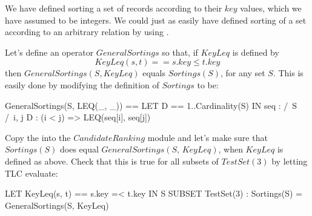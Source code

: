 \documentclass[fleqn,leqno]{article}
\begin{document}
\bigskip

We have defined sorting a set of records according to their $key$
values, which we have assumed to be integers.  We could just as easily
have defined sorting of a set according to an arbitrary relation by
using 
 .

Let's define an operator $GeneralSortings$ so that, if $KeyLeq$
is defined by
 \[ KeyLeq(s, t) == s.key \leq t.key
 \]
then $GeneralSortings(S, KeyLeq)$ equals $Sortings(S)$, for any set
$S$.  This is easily done by modifying the definition of $Sortings$
to be:
\begin{widedisplay}
\begin{notla}
GeneralSortings(S, LEQ(_, _)) ==
   LET D == 1..Cardinality(S)
   IN { seq \in [D -> S] : /\ S 
                           /\ \A i, j \in D : (i < j) => LEQ(seq[i], seq[j]) }
\end{notla}
\begin{tlatex}
%
%
\end{tlatex}
\end{widedisplay}
Copy the 
into the $CandidateRanking$ module and let's make sure that 
$Sortings(S)$ does equal $GeneralSortings(S,\,KeyLeq)$, when $KeyLeq$
is defined as above.  Check that this is true for all 
subsets of $TestSet(3)$ by letting TLC evaluate:%
\begin{widedisplay}
\begin{notla}
LET KeyLeq(s, t) == s.key =< t.key
IN \A S \in SUBSET TestSet(3) : Sortings(S) = GeneralSortings(S, KeyLeq)
\end{notla}
\begin{tlatex}
%
\end{tlatex}
\end{widedisplay}
\end{document}
